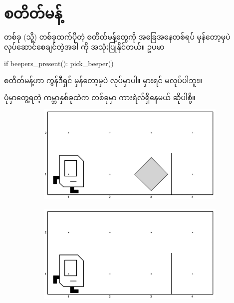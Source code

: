 \section{ စတိတ်မန့်}
တစ်ခု (သို့) တစ်ခုထက်ပိုတဲ့ စတိတ်မန့်တွေကို အခြေအနေတစ်ရပ် မှန်တော့မှပဲ လုပ်ဆောင်စေချင်တဲ့အခါ  ကို အသုံးပြုနိုင်တယ်။ ဥပမာ
%
\begin{py}
if beepers_present():
    pick_beeper()
\end{py}
%
 စတိတ်မန့်ဟာ  ကွန်ဒီရှင် မှန်တော့မှပဲ  လုပ်မှာပါ။ မှားရင် မလုပ်ပါဘူး။

ပုံမှာတွေ့ရတဲ့ ကမ္ဘာနှစ်ခုထဲက တစ်ခုမှာ ကားရဲလ်ရှိနေမယ် ဆိုပါစို့။
%
\begin{figure}[tbh!]
    \newcommand{\figpctw}{0.5}
    \newcommand{\figscale}{0.14}
    \begin{subfigure}[t]{{\figpctw}\textwidth}
        \includegraphics[scale=\figscale]{images/ch02/move_beeper_to_other_side_if_any/init1.jpg}
        \caption{}     
    \end{subfigure}
    \begin{subfigure}[t]{{\figpctw}\textwidth}
        \includegraphics[scale=\figscale]{images/ch02/move_beeper_to_other_side_if_any/init2.jpg}
        \caption{}    
    \end{subfigure}  
    \caption{}
    \label{fig:mbtos_if_any}
\end{figure}
